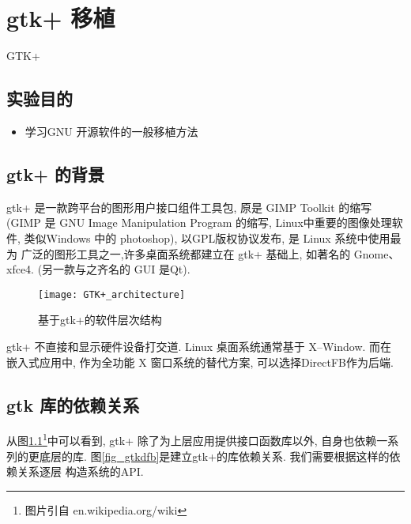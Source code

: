 \chapter{gtk+ 移植}{GTK+}

\section{实验目的}
\begin{itemize}\itemsep=-3pt
  \item 学习GNU 开源软件的一般移植方法
\end{itemize}

\section{gtk+ 的背景}
    gtk+ 是一款跨平台的图形用户接口组件工具包, 原是 GIMP Toolkit 的缩写
(GIMP 是 GNU Image Manipulation Program 的缩写, Linux中重要的图像处理软件,
类似Windows 中的 photoshop), 以GPL版权协议发布, 是 Linux 系统中使用最为
广泛的图形工具之一,许多桌面系统都建立在 gtk+ 基础上, 如著名的 Gnome、xfce4.
(另一款与之齐名的 GUI 是Qt).

\begin{figure}[!h]
  \centering
  \texttt{[image: GTK+\_architecture]}
  \caption{基于gtk+的软件层次结构}\label{fig_gtk}
\end{figure}

    gtk+ 不直接和显示硬件设备打交道. Linux 桌面系统通常基于 X--Window. 而在
嵌入式应用中, 作为全功能 X 窗口系统的替代方案, 可以选择DirectFB作为后端. 

\section{gtk 库的依赖关系}
从图\ref{fig_gtk}\footnote{图片引自 en.wikipedia.org/wiki}中可以看到, 
gtk+ 除了为上层应用提供接口函数库以外, 自身也依赖一系列的更底层的库.
图\ref{fig_gtkdfb}是建立gtk+的库依赖关系. 我们需要根据这样的依赖关系逐层
构造系统的API.\@


